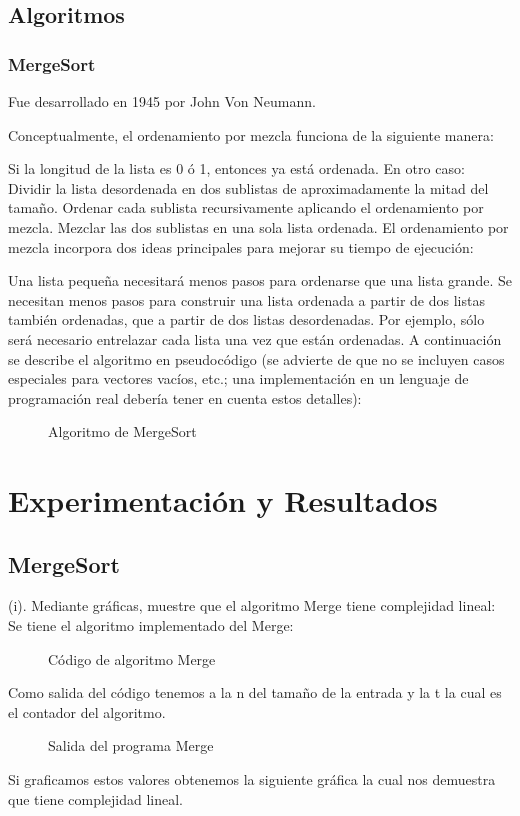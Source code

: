 \documentclass[12pt,twoside]{article}
\newcommand{\addfigure}[4]{
        \begin{figure}[htbp!]
            \begin{center}	
                \fbox{\texttt{[image: \#2]}}
                \caption{#4}
                \label{#3}
            \end{center}
        \end{figure}
  }
\begin{document}
\subsection{Algoritmos} 
\subsubsection{MergeSort}
Fue desarrollado en 1945 por John Von Neumann.

Conceptualmente, el ordenamiento por mezcla funciona de la siguiente manera:

Si la longitud de la lista es 0 ó 1, entonces ya está ordenada. En otro caso:
Dividir la lista desordenada en dos sublistas de aproximadamente la mitad del tamaño.
Ordenar cada sublista recursivamente aplicando el ordenamiento por mezcla.
Mezclar las dos sublistas en una sola lista ordenada.
El ordenamiento por mezcla incorpora dos ideas principales para mejorar su tiempo de ejecución:

Una lista pequeña necesitará menos pasos para ordenarse que una lista grande.
Se necesitan menos pasos para construir una lista ordenada a partir de dos listas también ordenadas, que a partir de dos listas desordenadas. Por ejemplo, sólo será necesario entrelazar cada lista una vez que están ordenadas.
A continuación se describe el algoritmo en pseudocódigo (se advierte de que no se incluyen casos especiales para vectores vacíos, etc.; una implementación en un lenguaje de programación real debería tener en cuenta estos detalles):
\\
\addfigure{.7}{img_tres/merge}{fig:M}{Algoritmo de MergeSort}
\section{Experimentación y Resultados}
\subsection{MergeSort}
(i). Mediante gráficas, muestre que el algoritmo Merge tiene complejidad lineal:
Se tiene el algoritmo implementado del Merge: 
\vspace{5 mm}

\addfigure{.7}{img_tres/mergesort}{fig:MC}{Código de algoritmo Merge}
Como salida del código tenemos a la n del tamaño de la entrada y la t la cual es el contador del algoritmo.

\addfigure{.25}{img_tres/SalidaMerge}{fig:SM}{Salida del programa Merge}
Si graficamos estos valores obtenemos la siguiente gráfica la cual nos demuestra que tiene complejidad lineal.
\\
\end{document}
